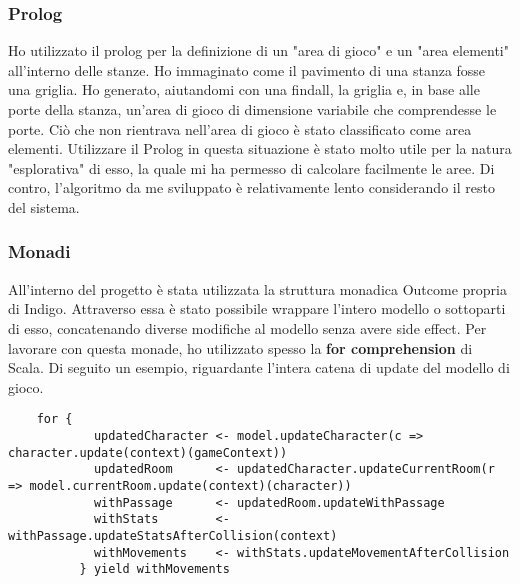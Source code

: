 \subsubsection{Prolog}
Ho utilizzato il prolog per la definizione di un "area di gioco" e un "area elementi" all'interno delle stanze. Ho immaginato come il pavimento di una stanza fosse una griglia. 
Ho generato, aiutandomi con una findall, la griglia e, in base alle porte della stanza, un'area di gioco di dimensione variabile che comprendesse le porte. 
Ciò che non rientrava nell'area di gioco è stato classificato come area elementi.
Utilizzare il Prolog in questa situazione è stato molto utile per la natura "esplorativa" di esso, la quale mi ha permesso di calcolare facilmente le aree. Di contro, l'algoritmo da me sviluppato è relativamente lento considerando il resto del sistema. 

\subsubsection{Monadi}
All'interno del progetto è stata utilizzata la struttura monadica Outcome propria di Indigo. 
Attraverso essa è stato possibile wrappare l'intero modello o sottoparti di esso, concatenando diverse modifiche al modello senza avere side effect. Per lavorare con questa monade, ho utilizzato spesso la \textbf{for comprehension} di Scala. 
Di seguito un esempio, riguardante l'intera catena di update del modello di gioco. 
\begin{lstlisting}
    for {
            updatedCharacter <- model.updateCharacter(c => character.update(context)(gameContext))
            updatedRoom      <- updatedCharacter.updateCurrentRoom(r => model.currentRoom.update(context)(character))
            withPassage      <- updatedRoom.updateWithPassage
            withStats        <- withPassage.updateStatsAfterCollision(context)
            withMovements    <- withStats.updateMovementAfterCollision
          } yield withMovements
\end{lstlisting}